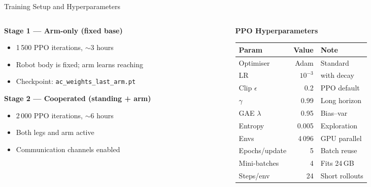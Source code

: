 \documentclass[10pt,aspectratio=169]{beamer}
\begin{document}
\begin{frame}{Training Setup and Hyperparameters}
  \begin{columns}[T]
    \begin{column}{0.50\textwidth}
      \textbf{Stage 1 --- Arm-only (fixed base)}
      \begin{itemize}
        \item 1\,500 PPO iterations, $\sim$3 hours
        \item Robot body is fixed; arm learns reaching
        \item Checkpoint: \texttt{ac\_weights\_last\_arm.pt}
      \end{itemize}

      \vspace{6pt}
      \textbf{Stage 2 --- Cooperated (standing + arm)}
      \begin{itemize}
        \item 2\,000 PPO iterations, $\sim$6 hours
        \item Both legs and arm active
        \item Communication channels enabled
      \end{itemize}
    \end{column}
    \begin{column}{0.48\textwidth}
      \centering
      \textbf{PPO Hyperparameters}\\[4pt]
      \small
      \begin{tabular}{l r l}
        \toprule
        \textbf{Param} & \textbf{Value} & \textbf{Note} \\
        \midrule
        Optimiser     & Adam     & Standard \\
        LR            & $10^{-3}$ & with decay \\
        Clip $\epsilon$ & 0.2    & PPO default \\
        $\gamma$      & 0.99     & Long horizon \\
        GAE $\lambda$ & 0.95     & Bias--var \\
        Entropy       & 0.005    & Exploration \\
        Envs          & 4\,096   & GPU parallel \\
        Epochs/update & 5        & Batch reuse \\
        Mini-batches  & 4        & Fits 24\,GB \\
        Steps/env     & 24       & Short rollouts \\
        \bottomrule
      \end{tabular}
    \end{column}
  \end{columns}
\end{frame}
\end{document}
